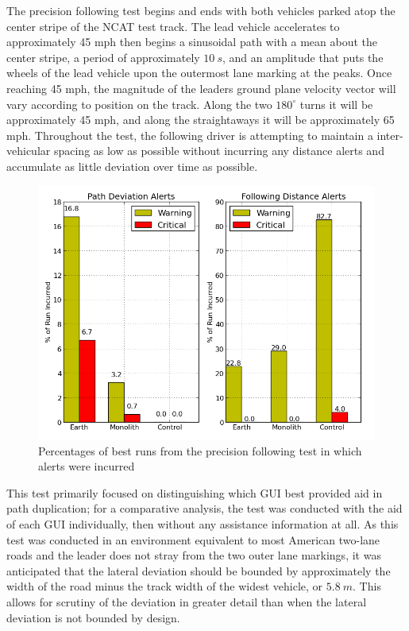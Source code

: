 \documentclass[twocolumn,10pt]{article}
\begin{document}
    The precision following test begins and ends with both vehicles parked atop the center stripe of the NCAT test track.  The lead vehicle accelerates to approximately 45 mph then begins a sinusoidal path with a mean about the center stripe, a period of approximately $10~s$, and an amplitude that puts the wheels of the lead vehicle upon the outermost lane marking at the peaks.  Once reaching 45 mph, the magnitude of the leaders ground plane velocity vector will vary according to position on the track.  Along the two $180^{\circ}$ turns it will be approximately 45 mph, and along the straightaways it will be approximately 65 mph.  Throughout the test, the following driver is attempting to maintain a inter-vehicular spacing as low as possible without incurring any distance alerts and accumulate as little deviation over time as possible.

    \begin{figure}[ht] \centering
      \includegraphics[width=\columnwidth]{../graphics/precision_following_alert_percents.png}
      \caption{Percentages of best runs from the precision following test in which alerts were incurred}
      \label{fig:precision_following_alert_percents}
    \end{figure}

    This test primarily focused on distinguishing which GUI best provided aid in path duplication; for a comparative analysis, the test was conducted with the aid of each GUI individually, then without any assistance information at all.  As this test was conducted in an environment equivalent to most American two-lane roads and the leader does not stray from the two outer lane markings, it was anticipated that the lateral deviation should be bounded by approximately the width of the road minus the track width of the widest vehicle, or $5.8~m$.  This allows for scrutiny of the deviation in greater detail than when the lateral deviation is not bounded by design.
\end{document}
